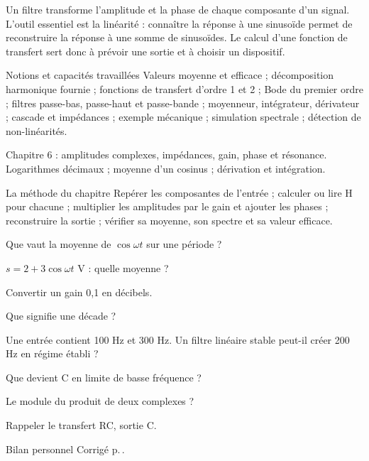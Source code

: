 Un filtre transforme l’amplitude et la phase de chaque composante d’un signal. L’outil essentiel est la linéarité : connaître la réponse à une sinusoïde permet de reconstruire la réponse à une somme de sinusoïdes. Le calcul d’une fonction de transfert sert donc à prévoir une sortie et à choisir un dispositif.
\begin{loi}{Notions et capacités travaillées}
Valeurs moyenne et efficace ; décomposition harmonique fournie ; fonctions de transfert d’ordre 1 et 2 ; Bode du premier ordre ; filtres passe-bas, passe-haut et passe-bande ; moyenneur, intégrateur, dérivateur ; cascade et impédances ; exemple mécanique ; simulation spectrale ; détection de non-linéarités.
\end{loi}

Chapitre 6 : amplitudes complexes, impédances, gain, phase et résonance. Logarithmes décimaux ; moyenne d’un cosinus ; dérivation et intégration.

\begin{methode}{La méthode du chapitre}
Repérer les composantes de l’entrée ; calculer ou lire H pour chacune ; multiplier les amplitudes par le gain et ajouter les phases ; reconstruire la sortie ; vérifier sa moyenne, son spectre et sa valeur efficace.
\end{methode}


\begin{questions}
\item Que vaut la moyenne de $\cos\omega t$ sur une période ?
\item $s=2+3\cos\omega t$ V : quelle moyenne ?
\item Convertir un gain 0,1 en décibels.
\item Que signifie une décade ?
\item Une entrée contient 100 Hz et 300 Hz. Un filtre linéaire stable peut-il créer 200 Hz en régime établi ?
\item Que devient C en limite de basse fréquence ?
\item Le module du produit de deux complexes ?
\item Rappeler le transfert RC, sortie C.
\end{questions}
\begin{docu}{Bilan personnel}
Corrigé p.\,\pageref{ch07-corr-diag}.
\end{docu}


